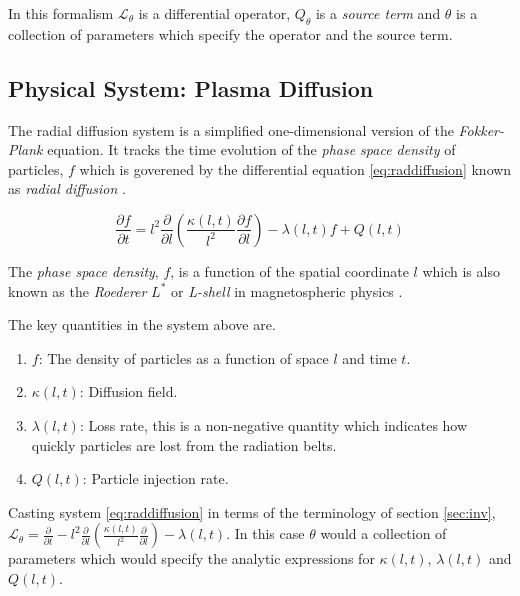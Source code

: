 \documentclass{article}
\begin{document}
In this formalism $\mathcal{L}_{\theta}$ is a differential operator,
$Q_{\theta}$ is a \emph{source term} and $\theta$ is a collection of parameters
which specify the operator and the source term.

\subsection{Physical System: Plasma Diffusion}

The radial diffusion system is a simplified one-dimensional version of
the \emph{Fokker-Plank} equation. It tracks the time evolution of the
\emph{phase space density} of particles, $f$ which is goverened by the
differential equation \ref{eq:raddiffusion} known as \emph{radial
  diffusion} \citep{JGRA:JGRA9345}.

\begin{equation}\label{eq:raddiffusion}
  \frac{\partial{f}}{\partial{t}} = l^2 \frac{\partial}{\partial{l}}\left( \frac{\kappa(l,
      t)}{l^{2}} \frac{\partial{f}}{\partial{l}} \right) - \lambda(l,
  t) f +  Q(l, t)
\end{equation}

The \emph{phase space density}, $f$, is a function of the spatial
coordinate $l$ which is also known as the \emph{Roederer} $L^*$ or
\emph{L-shell} in magnetospheric physics \citep{Roederer1970}.

The key quantities in the system above are.

\begin{enumerate}
\item $f$: The density of particles as a function of space $l$ and
  time $t$.
\item $\kappa(l, t)$: Diffusion field.
\item $\lambda(l, t)$: Loss rate, this is a non-negative
  quantity which indicates how quickly particles are lost from the
  radiation belts.
\item $Q(l, t)$: Particle injection rate.
\end{enumerate}

Casting system \ref{eq:raddiffusion} in terms of the terminology of
section \ref{sec:inv}, $\mathcal{L}_{\theta} =
\frac{\partial}{\partial{t}} - l^2 \frac{\partial}{\partial{l}}\left( \frac{\kappa(l,
      t)}{l^{2}} \frac{\partial}{\partial{l}} \right) - \lambda(l,
  t)$. In this case $\theta$ would a collection of parameters which
  would specify the analytic expressions for $\kappa(l,t)$,
  $\lambda(l,t)$ and $Q(l,t)$.
\end{document}
